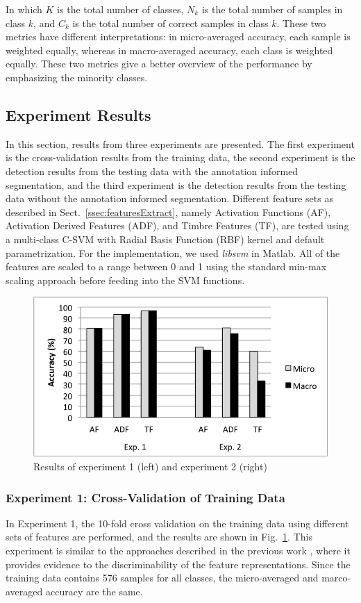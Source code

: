 \documentclass{article}
\begin{document}
{{{{{{{{{In which $K$ is the total number of classes, $N_{k}$ is the total number of samples in class $k$, and $C_{k}$ is the total number of correct samples in class $k$. These two metrics have different interpretations: in micro-averaged accuracy, each sample is weighted equally, whereas in macro-averaged accuracy, each class is weighted equally. These two metrics give a better overview of the performance by emphasizing the minority classes.  


\subsection{Experiment Results}\label{ssec:results}
In this section, results from three experiments are presented. The first experiment is the cross-validation results from the training data, the second experiment is the detection results from the testing data with the annotation informed segmentation, and the third experiment is the detection results from the testing data without the annotation informed segmentation. Different feature sets as described in Sect.~\ref{ssec:featuresExtract}, namely Activation Functions (AF), Activation Derived Features (ADF), and Timbre Features (TF), are tested using a multi-class C-SVM with Radial Basis Function (RBF) kernel and default parametrization. For the implementation, we used \textit{libsvm}\cite{Chang2011} in Matlab.  All of the features are scaled to a range between 0 and 1 using the standard min-max scaling approach before feeding into the SVM functions. 

\begin{figure}
\centering
\includegraphics[width = 8.0 cm]{./figures/exp1_exp2.png}
\caption{Results of experiment 1 (left) and experiment 2 (right)}
\label{fig:exp1n2}
\end{figure}

\subsubsection{Experiment 1: Cross-Validation of Training Data}\label{sssec:exp1}
In Experiment 1, the 10-fold cross validation on the training data using different sets of features are performed, and the results are shown in Fig.~\ref{fig:exp1n2}. This experiment is similar to the approaches described in the previous work \cite{Tindale2004, Prockup2013}, where it provides evidence to the discriminability of the feature representations. Since the training data contains 576 samples for all classes, the micro-averaged and marco-averaged accuracy are the same. 

}}}}}}}}}
\end{document}
